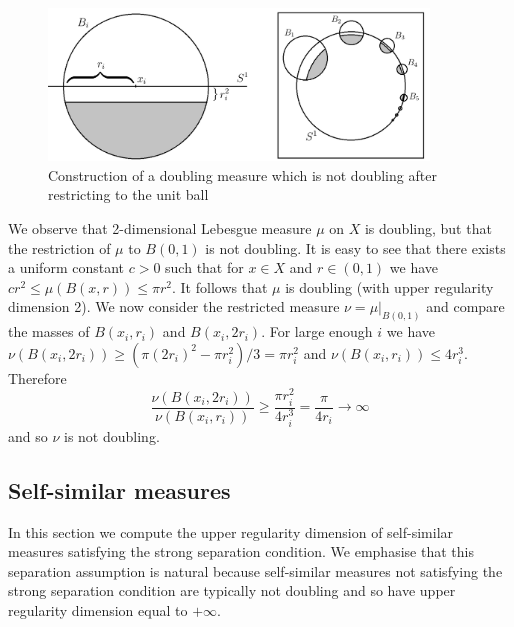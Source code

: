 \documentclass[12pt]{amsart}
\numberwithin{equation}{section}
\renewcommand{\ge}{\geqslant}
\renewcommand{\le}{\leqslant}
\renewcommand{\leq}{\leqslant}
\begin{document}
\begin{figure}[h]
\centering
\includegraphics[width=0.9\textwidth]{example.png}
\caption{Construction of a doubling measure which is not doubling after restricting to the unit ball}
\label{example}
\end{figure}

We observe  that 2-dimensional Lebesgue measure $\mu$ on $X$ is doubling, but that the restriction of $\mu$ to $B(0,1)$ is not doubling.  It is easy to see that there exists a uniform constant $c>0$ such that for $x \in X$ and $r\in (0,1)$ we have $cr^2 \leq \mu(B(x,r)) \leq \pi r^2$.  It follows that $\mu$ is doubling (with upper regularity dimension 2).  We now consider the restricted measure $\nu = \mu \vert_{B(0,1)}$ and compare the masses of $B(x_i,r_i)$ and $B(x_i,2r_i)$. For large enough $i$ we have $\nu (B(x_i,2r_i)) \ge (\pi (2r_i)^2-\pi r_i^2)/3 = \pi r_i^2$  and $\nu (B(x_i,r_i)) \le 4 r_i^3$. Therefore
\[
\frac{\nu(B(x_i,2r_i))}{\nu(B(x_i,r_i))} \ge \frac{\pi r_i^2}{4r_i^3} =  \frac{\pi}{4r_i} \to \infty
\]
and so  $\nu$ is not doubling.


\subsection{Self-similar measures}\label{self-similarresult}

In this section we compute the upper regularity dimension of self-similar measures satisfying the strong separation condition.  We emphasise that this separation assumption is natural because self-similar measures not satisfying the strong separation condition are typically not doubling and so have upper regularity dimension equal to $+\infty$.
\end{document}
